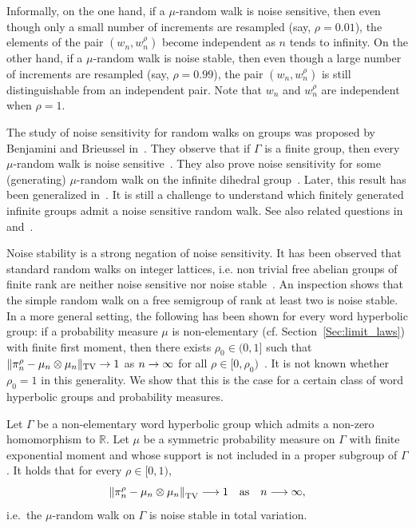 \documentclass[AHL,Unicode,longabstracts,published]{cedram}
\DeclareMathOperator{\TV}{TV}
\newcommand{\R}{\mathbb{R}}
\renewcommand{\(}{\left(}
\renewcommand{\)}{\right)}
\renewcommand*{\to}{\mathchoice{\longrightarrow}{\rightarrow}{\rightarrow}{\rightarrow}}
\begin{document}
Informally, on the one hand, if a $\mu$-random walk is noise sensitive, then even though only a small number of increments are resampled (say, $\rho=0.01$), the elements of the pair $(w_n, w^\rho_n)$ become independent as $n$ tends to infinity. On the other hand, if a $\mu$-random walk is noise stable, then even though a large number of increments are resampled (say, $\rho=0.99$), the pair $(w_n, w^\rho_n)$ is still distinguishable from an independent pair. Note that $w_n$ and $w^\rho_n$ are independent when $\rho=1$.


The study of noise sensitivity for random walks on groups was proposed by Benjamini and Brieussel in~\cite{BenjaminiBrieussel}. They observe that if $\Gamma$ is a finite group, then every $\mu$-random walk is noise sensitive~\cite[Proposition~5.1]{BenjaminiBrieussel}. They also prove noise sensitivity for some (generating) $\mu$-random walk on the infinite dihedral group~\cite[Theorem~1.4]{BenjaminiBrieussel}. Later, this result has been generalized in~\cite{Tnss}. It is still a challenge to understand which finitely generated infinite groups admit a noise sensitive random walk. See also related questions in~\cite{BenjaminiBrieussel} and~\cite[Section~3.3.4]{KalaiICM2018}.



Noise stability is a strong negation of noise sensitivity. It has been observed that standard random walks on integer lattices, i.e. non trivial free abelian groups of finite rank are neither noise sensitive nor noise stable~\cite[Appendix~A]{Tnss}. An inspection shows that the simple random walk on a free semigroup of rank at least two is noise stable. In a more general setting, the following has been shown for every word hyperbolic group: if a probability measure $\mu$ is non-elementary (cf. Section~\ref{Sec:limit_laws}) with finite first moment, then there exists $\rho_0 \in (0, 1]$ such that $\|\pi^\rho_n-\mu_n\otimes \mu_n\|_{\TV} \to 1$ as $n \to \infty$ for all $\rho \in [0, \rho_0)$~\cite[Theorem~1.3]{NonNS}. It is not known whether $\rho_0=1$ in this generality. We show that this is the case for a certain class of word hyperbolic groups and probability measures.

\begin{theo}\label{Thm:intro}
Let $\Gamma$ be a non-elementary word hyperbolic group which admits a non-zero homomorphism to $\R$. Let $\mu$ be a symmetric probability measure on $\Gamma$ with finite exponential moment and whose support is not included in a proper subgroup of $\Gamma$. It holds that for every $\rho \in [0, 1)$,
\[
\left\|\pi^\rho_n-\mu_n\otimes\mu_n\right\|_{\TV} \to 1 \quad \text{as}\quad n \to \infty,
\]
i.e.\ the $\mu$-random walk on $\Gamma$ is noise stable in total variation.
\end{theo}
\end{document}
